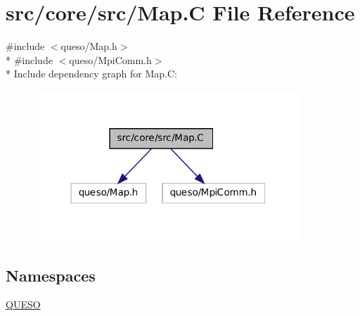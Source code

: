 \hypertarget{_map_8_c}{\section{src/core/src/\-Map.C File Reference}
\label{_map_8_c}
}
{\ttfamily \#include $<$queso/\-Map.\-h$>$}\\*
{\ttfamily \#include $<$queso/\-Mpi\-Comm.\-h$>$}\\*
Include dependency graph for Map.\-C\-:
\nopagebreak
\begin{figure}[H]
\begin{center}
\leavevmode
\includegraphics[width=286pt]{_map_8_c__incl}
\end{center}
\end{figure}
\subsection*{Namespaces}
\begin{DoxyCompactItemize}
\item 
\hyperlink{namespace_q_u_e_s_o}{Q\-U\-E\-S\-O}
\end{DoxyCompactItemize}
